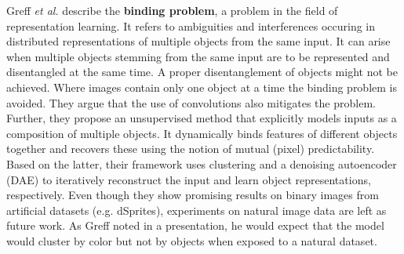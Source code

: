 \documentclass[12pt,a4paper]{article}
\begin{document}
\par Greff \textit{et al.} \cite{BindingRC} describe the \textbf{binding problem}, a problem in the field of representation learning. It refers to ambiguities and interferences occuring in distributed representations of multiple objects from the same input. It can arise when multiple objects stemming from the same input are to be represented and disentangled at the same time. A proper disentanglement of objects might not be achieved. Where images contain only one object at a time the binding problem is avoided. They argue that the use of convolutions also mitigates the problem. Further, they propose an unsupervised method that explicitly models inputs as a composition of multiple objects. It dynamically binds features of different objects together and recovers these using the notion of mutual (pixel) predictability. Based on the latter, their framework uses clustering and a denoising autoencoder (DAE) to iteratively reconstruct the input and learn object representations, respectively. Even though they show promising results on binary images from artificial datasets (e.g. dSprites), experiments on natural image data are left as future work. As Greff noted in a presentation, he would expect that the model would cluster by color but not by objects when exposed to a natural dataset. 

\end{document}
